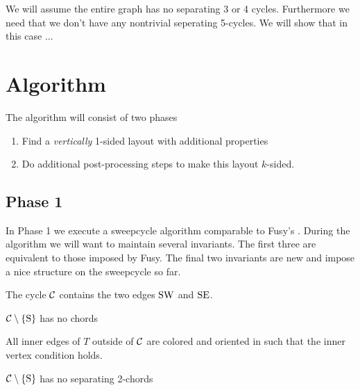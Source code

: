 \renewcommand{\Q}{\scr Q}



We will assume the entire graph has no separating 3 or 4 cycles. Furthermore we need that we don't have any nontrivial seperating 5-cycles.  We will show that in this case ...



\section{Algorithm}
  The algorithm will consist of two phases

  \begin{enumerate}
    \item Find a \emph{vertically} 1-sided layout with additional properties
    \item Do additional post-processing steps to make this layout $k$-sided.
  \end{enumerate}

\subsection{Phase 1}
  In Phase 1 we execute a sweepcycle algorithm comparable to Fusy's \cite{Fusy2006}.
  During the algorithm we will want to maintain several invariants. The first three are equivalent to those imposed by Fusy. The final two invariants are new and impose a nice structure on the sweepcycle so far.

  \begin{invariants}
    \itemsep=-4pt

    \item \label{i:uni:SWandSE} The cycle $\mathcal{C}$ contains the two edges $\mathrm{S} \mathrm{W}$ and $\mathrm{S} \mathrm{E}$.
    \item \label{i:uni:noChords} $\mathcal{C} \setminus \left\lbrace {\mathrm{S}} \right\rbrace$ has no chords
    \item \label{i:uni:intVertCond} All inner edges of $T$ outside of $\mathcal{C}$ are colored and oriented in such that the inner vertex condition holds. %
    \item \label{i:uni:no2Chords} $\mathcal{C}\setminus \left\lbrace {\mathrm{S}} \right\rbrace$ has no separating 2-chords
  \end{invariants}


